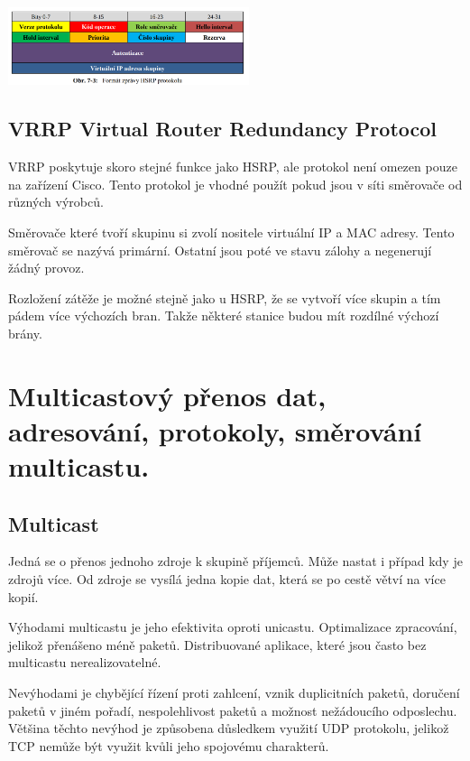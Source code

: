 \begin{center}
	\includegraphics[width=0.53\textwidth]{obrazky/050.png}
\end{center}


\subsection{VRRP Virtual Router Redundancy Protocol}

VRRP poskytuje skoro stejné funkce jako HSRP, ale protokol není omezen pouze na zařízení Cisco.
Tento protokol je vhodné použít pokud jsou v síti směrovače od různých výrobců.

Směrovače které tvoří skupinu si zvolí nositele virtuální IP a MAC adresy.
Tento směrovač se nazývá primární. Ostatní jsou poté ve stavu zálohy a negenerují žádný provoz.

Rozložení zátěže je možné stejně jako u HSRP, že se vytvoří více skupin a tím pádem více výchozích bran.
Takže některé stanice budou mít rozdílné výchozí brány. 

\clearpage
\section{Multicastový přenos dat, adresování, protokoly, směrování multicastu.}

\subsection{Multicast}

Jedná se o přenos jednoho zdroje k skupině příjemců.
Může nastat i případ kdy je zdrojů více.
Od zdroje se vysílá jedna kopie dat, která se po cestě větví na více kopií.

Výhodami multicastu je jeho efektivita oproti unicastu.
Optimalizace zpracování, jelikož přenášeno méně paketů.
Distribuované aplikace, které jsou často bez multicastu nerealizovatelné.

Nevýhodami je chybějící řízení proti zahlcení, vznik duplicitních paketů, doručení paketů v jiném pořadí, nespolehlivost paketů a možnost nežádoucího odposlechu.
Většina těchto nevýhod je způsobena důsledkem využití UDP protokolu, jelikož TCP nemůže být využit kvůli jeho spojovému charakterů. 

